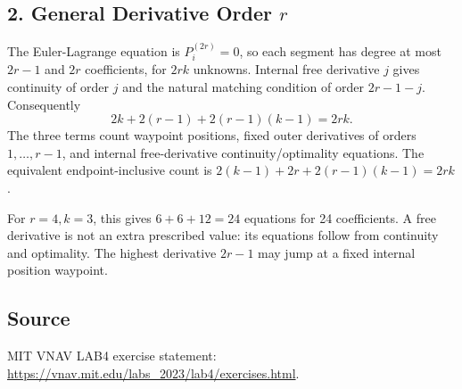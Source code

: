 \subsection{2. General Derivative Order \texorpdfstring{$r$}{r}}
The Euler-Lagrange equation is $P_i^{(2r)}=0$, so each segment has degree at most
$2r-1$ and $2r$ coefficients, for $2rk$ unknowns. Internal free derivative $j$
gives continuity of order $j$ and the natural matching condition of order
$2r-1-j$. Consequently
\begin{equation}
\boxed{2k+2(r-1)+2(r-1)(k-1)=2rk.}
\end{equation}
The three terms count waypoint positions, fixed outer derivatives of orders
$1,\ldots,r-1$, and internal free-derivative continuity/optimality equations.
The equivalent endpoint-inclusive count is
$2(k-1)+2r+2(r-1)(k-1)=2rk$.

For $r=4,k=3$, this gives $6+6+12=24$ equations for 24 coefficients. A free
derivative is not an extra prescribed value: its equations follow from
continuity and optimality. The highest derivative $2r-1$ may jump at a fixed
internal position waypoint.

\subsection*{Source}
MIT VNAV LAB4 exercise statement:
\url{https://vnav.mit.edu/labs_2023/lab4/exercises.html}.

